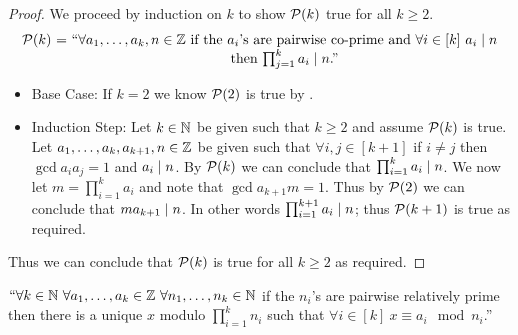         \begin{proof}
            We proceed by induction on $k$ to show $\mathcal{P}(k)$ true for all $k \ge 2$.
            \[\begin{array}{r@{\ = \ }c}
                \inductive{P}{k} & ``\mbox{$\forall a_1, \dots, a_k, n \in \set{Z}$ if the $a_i$'s are
                                    pairwise co-prime and $\forall i \in [k] \ \divides{a_i}{n}$} \\
                \multicolumn{1}{l}{} & \mbox{then $\divides{\prod_{j = 1}^{k} a_i}{n}$.''}
            \end{array}\]
            \begin{itemize}
                \item
                    Base Case: If $k = 2$ we know $\mathcal{P}(2)$ is true by .
                \item
                    Induction Step: Let $k \in \mathbb{N}$ be given such that $k \ge 2$ and assume
                    $\mathcal{P}(k)$ is true. Let $a_1, \dots, a_k, a_{k + 1}, n \in \mathbb{Z}$ be
                    given such that $\forall i, j \in [k + 1]$ if $i \neq j$ then $\gcd{a_i}{a_j} = 1$
                    and $a_i \mid n$. By $\mathcal{P}(k)$ we can conclude that
                    $\prod_{i = 1}^k a_i \mid n$. We now let $m = \prod_{i = 1}^k a_i$ and note
                    that $\gcd{a_{k + 1}}{m} = 1$. Thus by $\mathcal{P}(2)$ we can conclude that
                    $ma_{k + 1} \mid n$. In other words $\prod_{i = 1}^{k + 1} a_i \mid n$;
                    thus $\mathcal{P}(k + 1)$ is true as required.
            \end{itemize}
            Thus we can conclude that $\mathcal{P}(k)$ is true for all $k \ge 2$ as required. \QED
        \end{proof}
        \begin{theorem}
            $``\forall k \in \mathbb{N} \ \forall a_1, \dots, a_k \in \mathbb{Z} \
            \forall n_1, \dots, n_k \in \mathbb{N}$ if  the $n_i$'s are pairwise relatively prime
            then there is a unique $x$ modulo $\prod_{i = 1}^{k} n_i$ such that $\forall i \in [k] \ 
            x \equiv a_i \mod n_i$.''
            \label{Chinese Remainder Theorem}
        \end{theorem}
